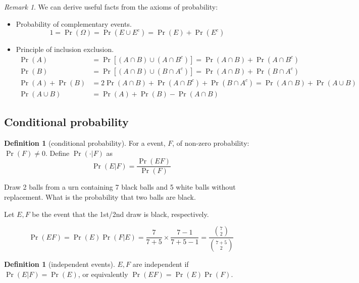 \documentclass{article}
\theoremstyle{definition}
\newtheorem{definition}[theorem]{Definition}
\theoremstyle{remark}
\newtheorem{remark}[theorem]{Remark}
\begin{document}
\begin{remark}
	We can derive useful facts from the axioms of probability:
	\begin{itemize}
		\item Probability of complementary events.
		      \[
			      1 = \Pr(\Omega) = \Pr(E \cup E^c) = \Pr(E) + \Pr(E^c)
		      \]
		\item Principle of inclusion exclusion.
		      \begin{align*}
			      \Pr(A)          & = \Pr\left[(A\cap B) \cup (A\cap B^c)\right] = \Pr(A\cap B) + \Pr(A\cap B^c)    \\
			      \Pr(B)          & = \Pr\left[(A\cap B) \cup (B\cap A^c)\right] = \Pr(A\cap B) + \Pr(B\cap A^c)    \\
			      \Pr(A) + \Pr(B) & = 2\Pr(A\cap B) + \Pr(A\cap B^c) + \Pr(B\cap A^c) = \Pr(A\cap B) + \Pr(A\cup B) \\
			      \Pr(A\cup B)    & = \Pr(A) + \Pr(B) - \Pr(A\cap B)
		      \end{align*}
	\end{itemize}
\end{remark}

\subsection{Conditional probability}


\begin{definition}[conditional probability]
	For a event, \(F\), of non-zero probability: \(\Pr(F)\neq 0\). Define \(\Pr(\cdot | F)\) as
	\[
		\Pr(E|F) = \frac{\Pr(EF)}{\Pr(F)}
	\]
\end{definition}

\begin{tcolorbox}[title=example]
	Draw 2 balls from a urn containing 7 black balls and 5 white balls without replacement.
	What is the probability that two balls are black.

	Let \(E,F\) be the event that the 1st/2nd draw is black, respectively.

	\[
		\Pr(EF) = \Pr(E)\Pr(F|E) = \frac{7}{7+5} \times \frac{7-1}{7+5-1} = \frac{\binom{7}{2}}{\binom{7+5}{2}}
	\]
\end{tcolorbox}

\begin{definition}[independent events]
	\(E,F\) are independent if \( \Pr(E|F) = \Pr(E) \), or equivalently \(\Pr(EF)=\Pr(E)\Pr(F)\).
\end{definition}
\end{document}
